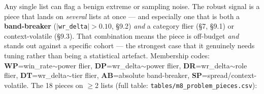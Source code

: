 \documentclass[10pt]{article}
\begin{document}
Any single list can flag a benign extreme or sampling noise. The robust signal is a piece that lands on \emph{several} lists at once --- and especially one that is both a \textbf{band-breaker} ($|$\texttt{wr\_\allowbreak{}delta}$|>0.10$, \S{}9.2) \emph{and} a category flier (\S{}7, \S{}9.1) or context-volatile (\S{}9.3). That combination means the piece is off-budget \emph{and} stands out against a specific cohort --- the strongest case that it genuinely needs tuning rather than being a statistical artefact. Membership codes: \textbf{WP}=win\_rate$\sim$power flier, \textbf{DP}=wr\_delta$\sim$power flier, \textbf{DR}=wr\_delta$\sim$role flier, \textbf{DT}=wr\_delta$\sim$tier flier, \textbf{AB}=absolute band-breaker, \textbf{SP}=spread/context-volatile. The 18 pieces on $\geq$2 lists (full table: \texttt{tables/\allowbreak{}m8\_\allowbreak{}problem\_\allowbreak{}pieces.\allowbreak{}csv}):\\
\end{document}
